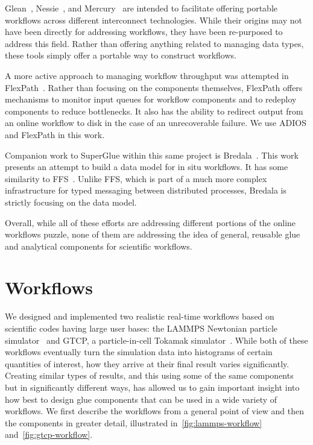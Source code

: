 \documentclass[conference]{IEEEtran}
\begin{document}
Glean~\cite{vishwanath:2011:glean}, Nessie~\cite{oldfield:lwfs-data-movement},
and Mercury~\cite{Soumagne:2013:mercury} are intended to facilitate offering
portable workflows across different interconnect technologies. While their
origins may not have been directly for addressing workflows, they have been
re-purposed to address this field. Rather than offering anything related to
managing data types, these tools simply offer a portable way to construct
workflows.

A more active approach to managing workflow throughput was attempted in
FlexPath~\cite{dayal:2014:flexpath}. Rather than focusing on the components
themselves, FlexPath offers mechanisms to monitor input queues for workflow
components and to redeploy components to reduce bottlenecks. It also has the
ability to redirect output from an online workflow to disk in the case of an
unrecoverable failure. We use ADIOS and FlexPath in this work.


Companion work to SuperGlue within this same project is
Bredala~\cite{dreher:2016:bredala}. This work presents an attempt to build a
data model for in situ workflows. It has some similarity to
FFS~\cite{eisenhauer:2011:ffs}. Unlike FFS, which is part of a much more
complex infrastructure for typed messaging between distributed processes,
Bredala is strictly focusing on the data model.

Overall, while all of these efforts are addressing different portions of the
online workflows puzzle, none of them are addressing the idea of general,
reusable glue and analytical components for scientific workflows.

\section{Workflows}
\label{s:workflow}

We designed and implemented two realistic real-time workflows based on
scientific codes having large user bases: the LAMMPS Newtonian particle
simulator~\cite{plimpton:1997:lammps} and GTCP, a particle-in-cell Tokamak
simulator~\cite{lin:gtc}. While both of these workflows eventually turn the
simulation data into histograms of certain quantities of interest, how they
arrive at their final result varies significantly. Creating similar types of
results, and this using some of the same components but in significantly
different ways, has allowed us to gain important insight into how best to
design glue components that can be used in a wide variety of workflows.
We first describe the workflows from a general point of view
and then the components in greater detail, illustrated
in~\autoref{fig:lammps-workflow} and~\autoref{fig:gtcp-workflow}.
\end{document}
